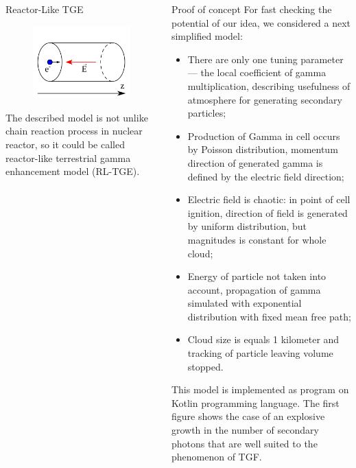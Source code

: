 \documentclass[final,hyperref={pdfpagelabels=false}]{beamer}
\begin{document}
\begin{frame}{}
\begin{columns}[t]
\begin{column}{0.32\linewidth}
\begin{block}{Reactor-Like TGE}
				\begin{figure}[htb]
					\centering
					\includegraphics[width=0.5\columnwidth]{cell.pdf}
				\end{figure}
            			The described model is not unlike chain reaction process in nuclear reactor, so it could be called reactor-like terrestrial gamma enhancement model (RL-TGE).
			\end{block}
			                  
			                  
			                
		\end{column}%
		            
		\begin{column}{0.32\linewidth}
			                
			\begin{block}{Proof of concept}  \justifying
				For fast checking the potential of our idea, we considered a next simplified model:  
				\begin{itemize}
					\item There are only one tuning parameter  --- the local coefficient of gamma multiplication, describing usefulness of atmosphere for generating secondary particles;
					\item Production of Gamma in cell occurs by Poisson distribution, momentum direction of generated gamma is defined by the electric field direction;
					\item Electric field is chaotic: in point of cell ignition, direction of field is generated by uniform distribution, but magnitudes is constant for whole cloud;
					\item Energy of particle not taken into account, propagation of gamma simulated with exponential distribution with fixed mean free path;
					\item Cloud size is equals 1 kilometer and tracking of particle leaving volume stopped. 
				\end{itemize}
				This model is implemented as program on Kotlin programming language.
                The first figure shows the case of an explosive growth in the number of secondary photons that are well suited to the phenomenon of TGF.
                 

\end{block}
\end{column}
\end{columns}
\end{frame}
\end{document}
